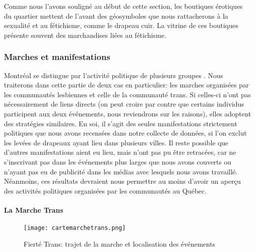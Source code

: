 Comme nous l'avons souligné au début de cette section, les boutiques érotiques du quartier mettent de l'avant des géosymboles que nous rattacherons à la sexualité et au fétichisme, comme le drapeau cuir.
La vitrine de ces boutiques présente souvent des marchandises liées au fétichisme.

\subsubsection{Marches et manifestations}
\label{subsec:label}
Montréal se distingue par l'activité politique de plusieurs groupes \lgbt{}.
Nous traiterons dans cette partie de deux cas en particulier: les marches organisées par les communautés lesbiennes et celle de la communauté trans.
Si celles-ci n'ont pas nécessairement de liens directs (on peut croire par contre que certains individus participent aux deux événements, nous reviendrons sur les raisons), elles adoptent des stratégies similaires.
En soi, il s'agit des seules manifestations strictement politiques que nous avons recensées dans notre collecte de données, si l'on exclut les levées de drapeaux ayant lieu dans plusieurs villes.
Il reste possible que d'autres manifestations aient eu lieu, mais n'ont pas pu être retracées, car ne s'inscrivant pas dans les événements plus larges que nous avons couverts ou n'ayant pas eu de publicité dans les médias avec lesquels nous avons travaillé.
Néanmoins, ces résultats devraient nous permettre au moins d'avoir un aperçu des activités politiques organisées par les communautés \lgbt{} au Québec.

\paragraph{La Marche Trans}
\label{subsubsec:marchetrans}

\begin{figure}[h]
  \centering
  \texttt{[image: cartemarchetrans.png]}
  \caption[Fierté Trans: trajet et événements]{Fierté Trans: trajet de la marche et localisation des événements}
  \label{fig:cartemarchetrans}
\end{figure}


